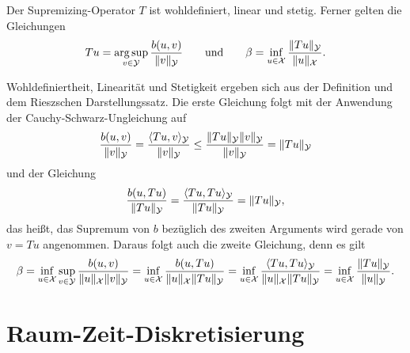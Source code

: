 \documentclass[../main.tex]{subfiles}
\begin{document}
\begin{Lemma}
\label{lemma:supremizing_operator}
    Der Supremizing-Operator $T$ ist wohldefiniert, linear und stetig.
    Ferner gelten die Gleichungen
    \begin{equation}
        \label{eq:supremizing_operator_ist_argsup}
        Tu = \operatorname*{arg\,sup}_{v \in \mathcal Y} \frac{b(u, v)}{\lVert v\rVert_{\mathcal Y}}
        \qquad\text{und}\qquad
        \beta = \inf_{u \in \mathcal X} \frac{\lVert Tu\rVert_{\mathcal Y}}{\lVert u\rVert_{\mathcal X}}.
    \end{equation}

    \begin{Beweis}
        Wohldefiniertheit, Linearität und Stetigkeit ergeben sich aus der Definition und dem Rieszschen Darstellungssatz.
        Die erste Gleichung folgt mit der Anwendung der Cauchy-Schwarz-Ungleichung auf
        \begin{equation}
            \frac{b(u, v)}{\lVert v\rVert_{\mathcal Y}}
            = \frac{\langle Tu,v\rangle_{\mathcal Y}}{\lVert v\rVert_{\mathcal Y}}
            \leq \frac{\lVert Tu\rVert_{\mathcal Y} \lVert v\rVert_{\mathcal Y}}{\lVert v\rVert_{\mathcal Y}}
            = \lVert Tu\rVert_{\mathcal Y}
        \end{equation}
        und der Gleichung
        \begin{equation}
            \frac{b(u, Tu)}{\lVert Tu\rVert_{\mathcal Y}}
            = \frac{\langle Tu,Tu\rangle_{\mathcal Y}}{\lVert Tu\rVert_{\mathcal Y}}
            = \lVert Tu\rVert_{\mathcal Y},
        \end{equation}
        das heißt, das Supremum von $b$ bezüglich des zweiten Arguments wird gerade von $v = Tu$ angenommen.
        Daraus folgt auch die zweite Gleichung, denn es gilt
        \begin{equation}
            \beta
            = \inf_{u \in \mathcal X} \sup_{v \in \mathcal Y} \frac{b(u, v)}{\lVert u\rVert_{\mathcal X} \lVert v\rVert_{\mathcal Y}}
            = \inf_{u \in \mathcal X} \frac{b(u, Tu)}{\lVert u\rVert_{\mathcal X} \lVert Tu\rVert_{\mathcal Y}}
            = \inf_{u \in \mathcal X} \frac{\langle Tu,Tu\rangle_{\mathcal Y}}{\lVert u\rVert_{\mathcal X}\lVert Tu\rVert_{\mathcal Y}}
            = \inf_{u \in \mathcal X} \frac{\lVert Tu\rVert_{\mathcal Y}}{\lVert u\rVert_{\mathcal Y}}.
        \end{equation}
    \end{Beweis}
\end{Lemma}


\section{Raum-Zeit-Diskretisierung} %
\label{section:raum_zeit_diskretisierung}
\end{document}
